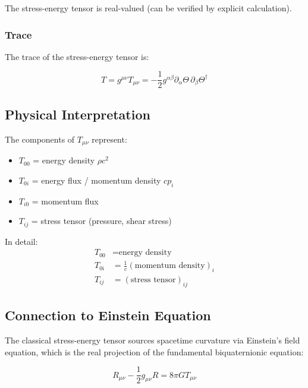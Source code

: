 The stress-energy tensor is real-valued (can be verified by explicit calculation).

\subsubsection{Trace}

The trace of the stress-energy tensor is:

\begin{equation}
\label{eq:canonical:stress_trace}
T = g^{\mu\nu} T_{\mu\nu} = -\frac{1}{2} g^{\alpha\beta} \partial_\alpha\Theta \, \partial_\beta\Theta^\dagger
\end{equation}

\subsection{Physical Interpretation}

The components of $T_{\mu\nu}$ represent:

\begin{itemize}
    \item $T_{00}$ = energy density $\rho c^2$
    \item $T_{0i}$ = energy flux / momentum density $c p_i$
    \item $T_{i0}$ = momentum flux
    \item $T_{ij}$ = stress tensor (pressure, shear stress)
\end{itemize}

In detail:
\begin{align}
T_{00} &= \text{energy density} \label{eq:canonical:T00} \\
T_{0i} &= \frac{1}{c}(\text{momentum density})_i \label{eq:canonical:T0i} \\
T_{ij} &= (\text{stress tensor})_{ij} \label{eq:canonical:Tij}
\end{align}

\subsection{Connection to Einstein Equation}

The classical stress-energy tensor sources spacetime curvature via Einstein's field equation, which is the real projection of the fundamental biquaternionic equation:

\begin{equation}
\label{eq:canonical:einstein_field_from_stress}
R_{\mu\nu} - \frac{1}{2} g_{\mu\nu} R = 8\pi G T_{\mu\nu}
\end{equation}

